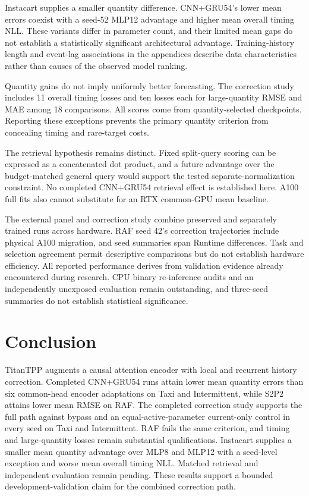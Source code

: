 \documentclass[runningheads]{llncs}
\begin{document}
Instacart supplies a smaller quantity difference. CNN+GRU54's lower mean errors coexist with a seed-52 MLP12 advantage and higher mean overall timing NLL. These variants differ in parameter count, and their limited mean gaps do not establish a statistically significant architectural advantage. Training-history length and event-lag associations in the appendices describe data characteristics rather than causes of the observed model ranking.

Quantity gains do not imply uniformly better forecasting. The correction study includes 11 overall timing losses and ten losses each for large-quantity RMSE and MAE among 18 comparisons. All scores come from quantity-selected checkpoints. Reporting these exceptions prevents the primary quantity criterion from concealing timing and rare-target costs.

The retrieval hypothesis remains distinct. Fixed split-query scoring can be expressed as a concatenated dot product, and a future advantage over the budget-matched general query would support the tested separate-normalization constraint. No completed CNN+GRU54 retrieval effect is established here. A100 full fits also cannot substitute for an RTX common-GPU mean baseline.

The external panel and correction study combine preserved and separately trained runs across hardware. RAF seed 42's correction trajectories include physical A100 migration, and seed summaries span Runtime differences. Task and selection agreement permit descriptive comparisons but do not establish hardware efficiency. All reported performance derives from validation evidence already encountered during research. CPU binary re-inference audits and an independently unexposed evaluation remain outstanding, and three-seed summaries do not establish statistical significance.

\section{Conclusion}
TitanTPP augments a causal attention encoder with local and recurrent history correction. Completed CNN+GRU54 runs attain lower mean quantity errors than six common-head encoder adaptations on Taxi and Intermittent, while S2P2 attains lower mean RMSE on RAF. The completed correction study supports the full path against bypass and an equal-active-parameter current-only control in every seed on Taxi and Intermittent. RAF fails the same criterion, and timing and large-quantity losses remain substantial qualifications. Instacart supplies a smaller mean quantity advantage over MLP8 and MLP12 with a seed-level exception and worse mean overall timing NLL. Matched retrieval and independent evaluation remain pending. These results support a bounded development-validation claim for the combined correction path.
\end{document}
